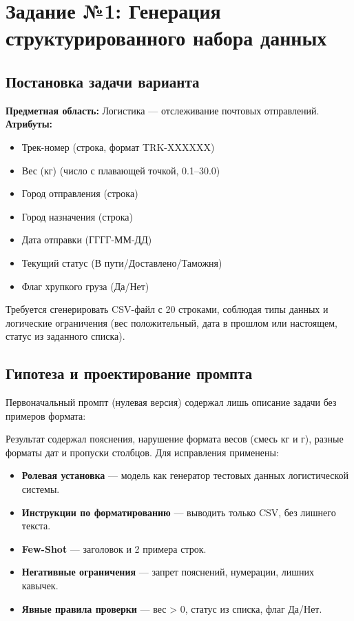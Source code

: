 \documentclass[oneside,a4paper,14pt]{extarticle} %
\begin{document}
\section{Задание №1: Генерация структурированного набора данных}
\subsection{Постановка задачи варианта}
\noindent
\textbf{Предметная область:} Логистика --- отслеживание почтовых отправлений.
\noindent
\textbf{Атрибуты:}
\begin{itemize}
\item Трек-номер (строка, формат TRK-XXXXXX)
\item Вес (кг) (число с плавающей точкой, 0.1--30.0)
\item Город отправления (строка)
\item Город назначения (строка)
\item Дата отправки (ГГГГ-ММ-ДД)
\item Текущий статус (В пути/Доставлено/Таможня)
\item Флаг хрупкого груза (Да/Нет)
\end{itemize}
\noindent
Требуется сгенерировать CSV-файл с 20 строками, соблюдая типы данных и логические ограничения (вес положительный, дата в прошлом или настоящем, статус из заданного списка).
\subsection{Гипотеза и проектирование промпта}
\noindent
Первоначальный промпт (нулевая версия) содержал лишь описание задачи без примеров формата:

\newpage
\noindent
Результат содержал пояснения, нарушение формата весов (смесь кг и г), разные форматы дат и пропуски столбцов. Для исправления применены:
\begin{itemize}
\item \textbf{Ролевая установка} --- модель как генератор тестовых данных логистической системы.
\item \textbf{Инструкции по форматированию} --- выводить только CSV, без лишнего текста.
\item \textbf{Few-Shot} --- заголовок и 2 примера строк.
\item \textbf{Негативные ограничения} --- запрет пояснений, нумерации, лишних кавычек.
\item \textbf{Явные правила проверки} --- вес > 0, статус из списка, флаг Да/Нет.
\end{itemize}
\end{document}

